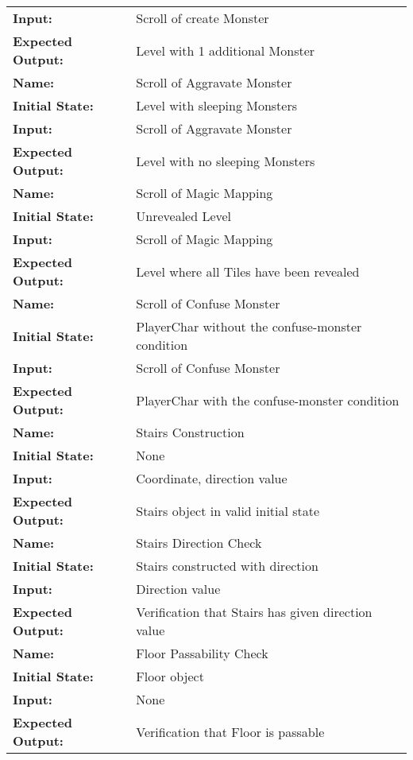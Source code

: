 \documentclass[12pt, titlepage]{article}
\begin{document}
\begin{center}
\begin{longtable}{ l | p{10cm} }
				\textbf{Input:} & Scroll of create Monster\\
				\textbf{Expected Output:} & Level with 1 additional Monster\\[0.6em]
				\hline
				\rule{0pt}{1.5em}\textbf{Name:} & Scroll of Aggravate Monster\\
				\textbf{Initial State:} & Level with sleeping Monsters\\
				\textbf{Input:} & Scroll of Aggravate Monster\\
				\textbf{Expected Output:} & Level with no sleeping Monsters\\[0.6em]
				\hline
				\rule{0pt}{1.5em}\textbf{Name:} & Scroll of Magic Mapping\\
				\textbf{Initial State:} & Unrevealed Level\\
				\textbf{Input:} & Scroll of Magic Mapping\\
				\textbf{Expected Output:} & Level where all Tiles have been revealed\\[0.6em]
				\hline
				\rule{0pt}{1.5em}\textbf{Name:} & Scroll of Confuse Monster\\
				\textbf{Initial State:} & PlayerChar without the confuse-monster condition\\
				\textbf{Input:} & Scroll of Confuse Monster\\
				\textbf{Expected Output:} & PlayerChar with the confuse-monster condition\\[0.6em]
				\hline
				\rule{0pt}{1.5em}\textbf{Name:} & Stairs Construction\\
				\textbf{Initial State:} & None\\
				\textbf{Input:} & Coordinate, direction value\\
				\textbf{Expected Output:} & Stairs object in valid initial state\\[0.6em]
				\hline
				\rule{0pt}{1.5em}\textbf{Name:} & Stairs Direction Check\\
				\textbf{Initial State:} & Stairs constructed with direction\\
				\textbf{Input:} & Direction value\\
				\textbf{Expected Output:} & Verification that Stairs has given direction value\\[0.6em]
				\hline
				\rule{0pt}{1.5em}\textbf{Name:} & Floor Passability Check\\
				\textbf{Initial State:} & Floor object\\
				\textbf{Input:} & None\\
				\textbf{Expected Output:} & Verification that Floor is passable\\[0.6em]

\end{longtable}
\end{center}
\end{document}
